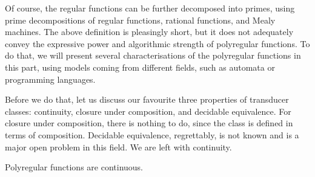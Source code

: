 Of course, the regular functions can be further decomposed into primes, using prime decompositions of regular functions, rational functions, and Mealy machines. The above definition is pleasingly short, but it does not adequately convey the expressive power and algorithmic strength of polyregular functions. To do that, we will present several characterisations of the polyregular functions in this part, using models coming from different fields, such as automata or programming languages.

Before we do that, let us discuss our favourite three properties of transducer classes: continuity, closure under composition, and decidable equivalence. For closure under composition, there is nothing to do, since the class is defined in terms of composition. Decidable equivalence, regrettably, is not known and is a major open problem in this field. We are left with continuity.

\begin{theorem}\label{thm:polyregular-functions-are-continuous}
    Polyregular functions are continuous.
\end{theorem}

